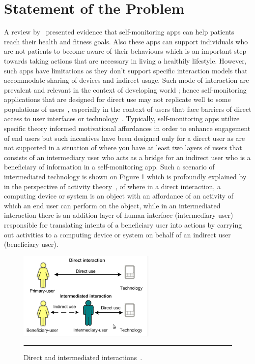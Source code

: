 \section{Statement of the Problem}
A review by~\cite{higgins2016smartphone} presented evidence that self-monitoring apps can help patients reach their health and fitness goals. Also these apps can support individuals who are not patients to become aware of their behaviours which is an important step towards taking actions that are necessary in living a healthily lifestyle. However, such apps have limitations as they don't support specific interaction models that accommodate sharing of devices and indirect usage. Such mode of interaction are prevalent and relevant in the context of developing world ; hence self-monitoring applications that are designed for direct use may not replicate well to some populations of users~\citep{kaplan2006can,sambasivan2010}, especially in the context of users that face barriers of direct access to user interfaces or technology~\citep{kumar2015mobile}. Typically, self-monitoring apps utilize  specific theory informed motivational affordances in order to enhance engagement of end users but such incentives have been designed only for a direct user as are not supported in a situation of where you have at least two layers of users that consists of an intermediary user who acts as a bridge for an indirect user who is a beneficiary of information in a self-monitoring app. Such a scenario of intermediated technology is shown on Figure \ref{figure:directVSinterm}  which is profoundly explained by~\cite{sambasivan2010} in the perspective of activity theory~\citep{kaptelinin1997activity}, of where in a direct interaction, a computing device or system is an object with an affordance of an activity of which an end user can perform on the object, while in an intermediated interaction there is an addition layer of human interface (intermediary user) responsible for translating intents of a beneficiary user into actions by carrying out activities to a computing device or system on behalf of an indirect user (beneficiary user).
\begin{figure}[htbp]
  \centering
    \includegraphics[width=0.6\textwidth]{Figures/intermediated.png}
    \rule{35em}{0.5pt}
  \caption{Direct and intermediated interactions~\citep{sambasivan2010}.}
  \label{figure:directVSinterm}
\end{figure}

